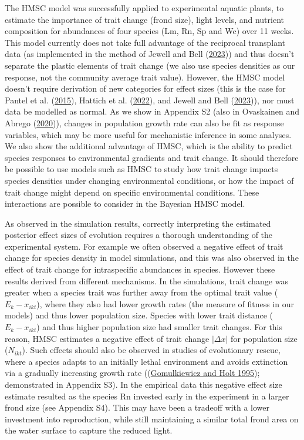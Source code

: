 \documentclass[
]{article}
\begin{document}
The HMSC model was successfully applied to experimental aquatic plants, to estimate the importance of trait change (frond size), light levels, and nutrient composition for abundances of four species (Lm, Rn, Sp and Wc) over 11 weeks. This model currently does not take full advantage of the reciprocal transplant data (as implemented in the method of Jewell and Bell (\protect\hyperlink{ref-Jewell2023}{2023})) and thus doesn't separate the plastic elements of trait change (we also use species densities as our response, not the community average trait value). However, the HMSC model doesn't require derivation of new categories for effect sizes (this is the case for Pantel et al. (\protect\hyperlink{ref-Pantel2015}{2015}), Hattich et al. (\protect\hyperlink{ref-Hattich2022}{2022}), and Jewell and Bell (\protect\hyperlink{ref-Jewell2023}{2023})), nor must data be modelled as normal. As we show in Appendix S2 (also in Ovaskainen and Abrego (\protect\hyperlink{ref-Ovaskainen2020}{2020})), changes in population growth rate can also be fit as response variables, which may be more useful for mechanistic inference in some analyses. We also show the additional advantage of HMSC, which is the ability to predict species responses to environmental gradients and trait change. It should therefore be possible to use models such as HMSC to study how trait change impacts species densities under changing environmental conditions, or how the impact of trait change might depend on specific environmental conditions. These interactions are possible to consider in the Bayesian HMSC model.

As observed in the simulation results, correctly interpreting the estimated posterior effect sizes of evolution requires a thorough understanding of the experimental system. For example we often observed a negative effect of trait change for species density in model simulations, and this was also observed in the effect of trait change for intraspecific abundances in species. However these results derived from different mechanisms. In the simulations, trait change was greater when a species trait was further away from the optimal trait value (\(E_k - x_{ikt}\)), where they also had lower growth rates (the measure of fitness in our models) and thus lower population size. Species with lower trait distance (\(E_k - x_{ikt}\)) and thus higher population size had smaller trait changes. For this reason, HMSC estimates a negative effect of trait change \(|\Delta x|\) for population size (\(N_{ikt}\)). Such effects should also be observed in studies of evolutionary rescue, where a species adapts to an initially lethal environment and avoids extinction via a gradually increasing growth rate ((\protect\hyperlink{ref-Gomulkiewicz1995}{Gomulkiewicz and Holt 1995}); demonstrated in Appendix S3). In the empirical data this negative effect size estimate resulted as the species Rn invested early in the experiment in a larger frond size (see Appendix S4). This may have been a tradeoff with a lower investment into reproduction, while still maintaining a similar total frond area on the water surface to capture the reduced light.
\end{document}
